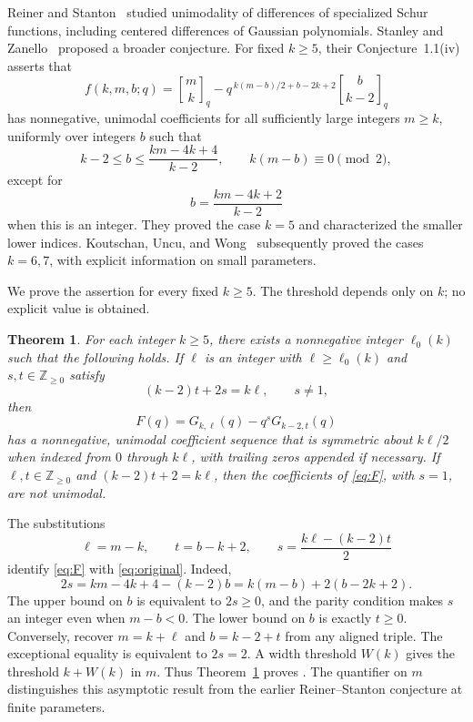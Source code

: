 \documentclass[3p,11pt,number]{elsarticle}
\newtheorem{theorem}{Theorem}[section]
\theoremstyle{remark}
\numberwithin{equation}{section}
\newcommand{\qbinom}[2]{\genfrac{[}{]}{0pt}{}{#1}{#2}_q}
\newcommand{\NN}{\mathbb Z_{\ge0}}
\begin{document}
Reiner and Stanton~\cite{RS98} studied unimodality of differences of
specialized Schur functions, including centered differences of Gaussian
polynomials. Stanley and Zanello~\cite{SZ20} proposed a broader
conjecture. For fixed \(k\ge5\), their Conjecture~1.1(iv) asserts that
\begin{equation}\label{eq:original}
f(k,m,b;q)=\qbinom{m}{k}
-q^{\,k(m-b)/2+b-2k+2}\qbinom{b}{k-2}
\end{equation}
has nonnegative, unimodal coefficients for all sufficiently large integers
\(m\ge k\),
uniformly over integers \(b\) such that
\begin{equation}\label{eq:admissible-original}
k-2\le b\le\frac{km-4k+4}{k-2},
\qquad k(m-b)\equiv0\pmod2,
\end{equation}
except for
\begin{equation}\label{eq:exception-original}
b=\frac{km-4k+2}{k-2}
\end{equation}
when this is an integer.
They proved the case \(k=5\) and characterized the smaller lower
indices. Koutschan, Uncu, and Wong~\cite{KUW23} subsequently proved the
cases \(k=6,7\), with explicit information on small parameters.

We prove the assertion for every fixed \(k\ge5\). The threshold depends only on \(k\); no explicit value is obtained.

\begin{theorem}\label{thm:main}
For each integer \(k\ge5\), there exists a nonnegative integer
\(\ell_0(k)\) such
that the following holds. If \(\ell\) is an integer with
\(\ell\ge\ell_0(k)\) and \(s,t\in\NN\)
satisfy
\begin{equation}\label{eq:alignment}
(k-2)t+2s=k\ell,\qquad s\ne1,
\end{equation}
then
\begin{equation}\label{eq:F}
F(q)=G_{k,\ell}(q)-q^sG_{k-2,t}(q)
\end{equation}
has a nonnegative, unimodal coefficient sequence that is symmetric about
\(k\ell/2\) when indexed from \(0\) through \(k\ell\), with trailing
zeros appended if necessary.
If \(\ell,t\in\NN\) and
\((k-2)t+2=k\ell\), then the coefficients of \eqref{eq:F},
with \(s=1\), are not unimodal.
\end{theorem}

The substitutions
\begin{equation}\label{eq:substitution}
\ell=m-k,\qquad t=b-k+2,\qquad
s=\frac{k\ell-(k-2)t}{2}
\end{equation}
identify \eqref{eq:F} with \eqref{eq:original}.
Indeed,
\[
  2s=km-4k+4-(k-2)b=k(m-b)+2(b-2k+2).
\]
The upper bound on \(b\) is equivalent to \(2s\ge0\), and the
parity condition makes \(s\) an integer even when \(m-b<0\).
The lower bound on \(b\) is exactly \(t\ge0\).
Conversely, recover \(m=k+\ell\) and \(b=k-2+t\) from any aligned
triple. The exceptional equality is equivalent to \(2s=2\).
A width threshold \(W(k)\) gives the threshold \(k+W(k)\) in \(m\). Thus Theorem~\ref{thm:main} proves
\cite[Conjecture~1.1(iv)]{SZ20}.
The quantifier on \(m\) distinguishes this asymptotic result from the
earlier Reiner--Stanton conjecture at finite parameters.
\end{document}
